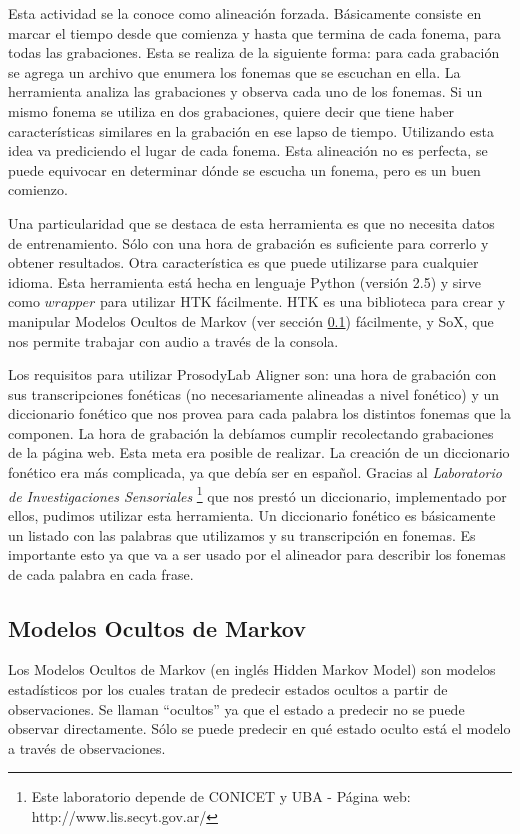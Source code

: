 Esta actividad se la conoce como alineación forzada. Básicamente consiste en marcar el tiempo desde que comienza y hasta que termina de cada fonema, para todas las grabaciones. Esta se realiza de la siguiente forma: para cada grabación se agrega un archivo que enumera los fonemas que se escuchan en ella. La herramienta analiza las grabaciones y observa cada uno de los fonemas. Si un mismo fonema se utiliza en dos grabaciones, quiere decir que tiene haber características similares en la grabación en ese lapso de tiempo. Utilizando esta idea va prediciendo el lugar de cada fonema. Esta alineación no es perfecta, se puede equivocar en determinar dónde se escucha un fonema, pero es un buen comienzo.  

Una particularidad que se destaca de esta herramienta es que no necesita datos de entrenamiento. Sólo con una hora de grabación es suficiente para correrlo y obtener resultados. Otra característica es que puede utilizarse para cualquier idioma. Esta herramienta está hecha en lenguaje Python (versión 2.5) y sirve como $wrapper$ para utilizar HTK fácilmente. HTK es una biblioteca para crear y manipular Modelos Ocultos de Markov (ver sección \ref{sec:hmm}) fácilmente, y SoX, que nos permite trabajar con audio a través de la consola. 

Los requisitos para utilizar ProsodyLab Aligner son: una hora de grabación con sus transcripciones fonéticas (no necesariamente alineadas a nivel fonético) y un diccionario fonético que nos provea para cada palabra los distintos fonemas que la componen. La hora de grabación la debíamos cumplir recolectando grabaciones de la página web. Esta meta era posible de realizar. La creación de un diccionario fonético era más complicada, ya que debía ser en español. Gracias al \textit{Laboratorio de Investigaciones Sensoriales} \footnote{Este laboratorio depende de CONICET y UBA - Página web: http://www.lis.secyt.gov.ar/} que nos prestó un diccionario, implementado por ellos, pudimos utilizar esta herramienta. Un diccionario fonético es básicamente un listado con las palabras que utilizamos y su transcripción en fonemas. Es importante esto ya que va a ser usado por el alineador para describir los fonemas de cada palabra en cada frase.

\subsection{Modelos Ocultos de Markov}
\label{sec:hmm}
Los Modelos Ocultos de Markov \cite{rabiner} (en inglés Hidden Markov Model) son modelos estadísticos por los cuales tratan de predecir estados ocultos a partir de observaciones. Se llaman ``ocultos'' ya que el estado a predecir no se puede observar directamente. Sólo se puede predecir en qué estado oculto está el modelo a través de observaciones. 

